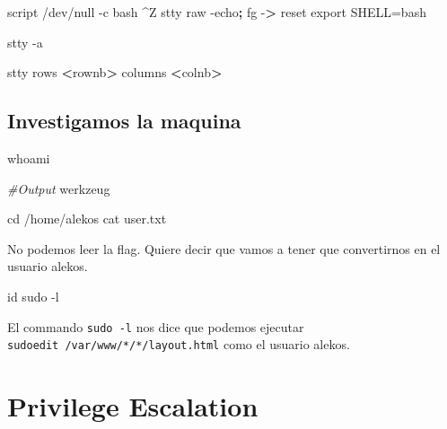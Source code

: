\documentclass{assets/ipesethesis}
\newenvironment{Shaded}{\begin{snugshade}}{\end{snugshade}}
\newcommand{\BuiltInTok}[1]{#1}
\newcommand{\CommentTok}[1]{\textcolor[rgb]{0.56,0.35,0.01}{\textit{#1}}}
\newcommand{\ExtensionTok}[1]{#1}
\newcommand{\FunctionTok}[1]{\textcolor[rgb]{0.00,0.00,0.00}{#1}}
\newcommand{\KeywordTok}[1]{\textcolor[rgb]{0.13,0.29,0.53}{\textbf{#1}}}
\newcommand{\NormalTok}[1]{#1}
\newcommand{\OperatorTok}[1]{\textcolor[rgb]{0.81,0.36,0.00}{\textbf{#1}}}
\newcommand{\VariableTok}[1]{\textcolor[rgb]{0.00,0.00,0.00}{#1}}
\begin{document}
\begin{Shaded}
\begin{Highlighting}[]
\ExtensionTok{script}\NormalTok{ /dev/null -c bash}
\NormalTok{^}\ExtensionTok{Z}
\FunctionTok{stty}\NormalTok{ raw -echo}\KeywordTok{;} \BuiltInTok{fg}
\ExtensionTok{-}\OperatorTok{>}\NormalTok{ reset}
\BuiltInTok{export} \VariableTok{SHELL=}\NormalTok{bash}

\FunctionTok{stty}\NormalTok{ -a}

\FunctionTok{stty}\NormalTok{ rows }\OperatorTok{<}\NormalTok{rownb}\OperatorTok{>}\NormalTok{ columns }\OperatorTok{<}\NormalTok{colnb}\OperatorTok{>}
\end{Highlighting}
\end{Shaded}

\hypertarget{investigamos-la-maquina-2}{%
\subsection*{Investigamos la maquina}\label{investigamos-la-maquina-2}}

\begin{Shaded}
\begin{Highlighting}[]
\FunctionTok{whoami}

\CommentTok{#Output}
\ExtensionTok{werkzeug}

\BuiltInTok{cd}\NormalTok{ /home/alekos}
\FunctionTok{cat}\NormalTok{ user.txt}
\end{Highlighting}
\end{Shaded}

No podemos leer la flag. Quiere decir que vamos a tener que convertirnos en el usuario alekos.

\begin{Shaded}
\begin{Highlighting}[]
\FunctionTok{id}
\FunctionTok{sudo}\NormalTok{ -l}
\end{Highlighting}
\end{Shaded}

El commando \texttt{sudo\ -l} nos dice que podemos ejecutar \texttt{sudoedit\ /var/www/*/*/layout.html} como el usuario alekos.

\hypertarget{privilege-escalation-3}{%
\section*{Privilege Escalation}\label{privilege-escalation-3}}
\end{document}
